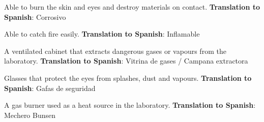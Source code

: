 \begin{vocabulary}[Corrosive]
    Able to burn the skin and eyes and destroy materials on contact. \newline
    \textbf{Translation to Spanish}: Corrosivo
\end{vocabulary}

\begin{vocabulary}[Flammable]
    Able to catch fire easily. \newline
    \textbf{Translation to Spanish}: Inflamable
\end{vocabulary}

\begin{vocabulary}
    A ventilated cabinet that extracts dangerous gases or vapours from the laboratory. \newline
    \textbf{Translation to Spanish}: Vitrina de gases / Campana extractora
\end{vocabulary}

\begin{vocabulary}
    Glasses that protect the eyes from splashes, dust and vapours. \newline
    \textbf{Translation to Spanish}: Gafas de seguridad
\end{vocabulary}

\begin{vocabulary}
    A gas burner used as a heat source in the laboratory. \newline
    \textbf{Translation to Spanish}: Mechero Bunsen
\end{vocabulary}
